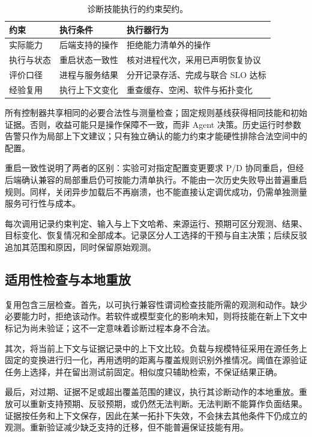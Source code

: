 \documentclass[preprint,12pt]{elsarticle}
\begin{document}
\begin{table}[htbp]
\centering\small
\begin{tabularx}{\linewidth}{@{}>{\raggedright\arraybackslash}p{26mm}YY@{}}
\toprule
约束 & 执行条件 & 执行器行为 \\
\midrule
实际能力 & 后端支持的操作 & 拒绝能力清单外的操作 \\
执行与状态 & 重启状态一致性 & 核对进程代次，采用已声明恢复协议 \\
评价口径 & 进程与服务结果 & 分开记录存活、完成与联合 SLO 达标 \\
经验复用 & 执行上下文变化 & 重查缓存、空闲、软件与拓扑变化 \\
\bottomrule
\end{tabularx}
\caption{诊断技能执行的约束契约。}
\label{tab:contracts}
\end{table}

所有控制器共享相同的必要合法性与测量检查；固定规则基线获得相同技能和初始证据。否则，收益可能只是操作保障不一致，而非 Agent 决策。历史运行时参数告警只作为局部上下文建议；只有独立确认的能力约束才能硬性排除合法空间中的配置。

重启一致性说明了两者的区别：实验可对指定配置变更要求 P/D 协同重启，但经后端确认兼容的局部重启仍可按能力清单执行。不能由一次历史失败导出普遍重启规则。同样，关闭异步加载后不再崩溃，也不能直接认定调优成功，仍需单独测量服务可行性与成本。

每次调用记录约束判定、输入与上下文哈希、来源运行、预期可区分观测、结果、目标变化、恢复情况和全部成本。记录区分人工选择的干预与自主决策；后续反驳追加其范围和原因，同时保留原始观测。

\subsection{适用性检查与本地重放}
复用包含三层检查。首先，以可执行兼容性谓词检查技能所需的观测和动作。缺少必要能力时，拒绝该动作。若软件或模型变化的影响未知，则将技能在新上下文中标记为尚未验证；这不一定意味着诊断过程本身不合法。

其次，将当前上下文与证据记录中的上下文比较。负载与规模特征采用在源任务上固定的变换进行归一化，再用透明的距离与覆盖规则识别外推情况。阈值在源验证任务上选择，并在留出测试前固定。相似度只辅助检索，不保证结果正确。

最后，对过期、证据不足或超出覆盖范围的建议，执行其诊断动作的本地重放。重放可以重新支持预期、反驳预期，或仍然无法判断。无法判断不能算作负面结果。证据按任务和上下文保存，因此在某一拓扑下失效，不会抹去其他条件下仍成立的观测。重新验证减少缺乏支持的迁移，但不能普遍保证技能有用。
\end{document}
